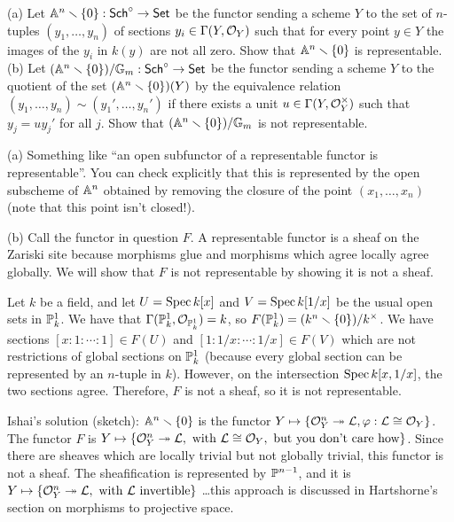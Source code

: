 \begin{exercise}[1.3]
  (a) Let $\AA^n\setminus \{0\}:\sch^\circ\to \set$ be the functor sending
  a scheme $Y$ to the set of $n$-tuples $(y_1,\dots, y_n)$ of sections $y_i\in
  \Ga(Y,\O_Y)$ such that for every point $y\in Y$ the images of the $y_i$ in $k(y)$ are
  not all zero. Show that $\AA^n\setminus \{0\}$ is representable.\\
  (b) Let $(\AA^n\setminus \{0\})/\GG_m:\sch^\circ\to \set$ be the functor
  sending a scheme $Y$ to the quotient of the set $(\AA^n\setminus\{0\})(Y)$ by the
  equivalence relation $(y_1,\dots, y_n)\sim (y_1',\dots, y_n')$ if there exists a unit
  $u\in \Ga(Y,\O_Y^\times)$ such that $y_j=uy_j'$ for all $j$. Show that $(\AA^n\setminus
  \{0\})/\GG_m$ is not representable.
\end{exercise}
\begin{solution}
  (a) Something like ``an open subfunctor of a representable functor is representable''.
  You can check explicitly that this is represented by the open subscheme of $\AA^n$
  obtained by removing the closure of the point $(x_1,\dots, x_n)$ (note that this point
  isn't closed!).

  (b) Call the functor in question $F$. A representable functor is a sheaf on the
  Zariski site because morphisms glue and morphisms which agree locally agree globally.
  We will show that $F$ is not representable by showing it is not a sheaf.

  Let $k$ be a field, and let $U=\spec k[x]$ and $V=\spec k[1/x]$ be the usual open sets
  in $\PP^1_k$. We have that $\Ga(\PP^1_k,\O_{\PP^1_k})=k$, so
  $F(\PP^1_k)=(k^n\setminus\{0\})/k^\times$. We have sections $[x:1:\cdots:1]\in F(U)$
  and $[1:1/x:\cdots:1/x]\in F(V)$ which are not restrictions of global sections on
  $\PP^1_k$ (because every global section can be represented by an $n$-tuple in $k$).
  However, on the intersection $\spec k[x,1/x]$, the two sections agree. Therefore, $F$
  is not a sheaf, so it is not representable.

  \smallskip
  Ishai's solution (sketch): $\AA^n\smallsetminus \{0\}$ is the functor $Y\mapsto
  \{\O_Y^n\twoheadrightarrow \mathcal{L}, \varphi:\mathcal{L}\cong \O_Y\}$. The functor
  $F$ is $Y\mapsto \{\O_Y^n\twoheadrightarrow \mathcal{L},\text{ with }\mathcal{L}\cong
  \O_Y,\text{ but you don't care how}\}$. Since there are sheaves which are locally
  trivial but not globally trivial, this functor is not a sheaf. The sheafification is
  represented by $\PP^{n-1}$, and it is $Y\mapsto \{\O_Y^n\twoheadrightarrow
  \mathcal{L},\text{ with } \mathcal{L}\text{ invertible}\}$ \dots this approach is
  discussed in Hartshorne's section on morphisms to projective space.
\end{solution}

